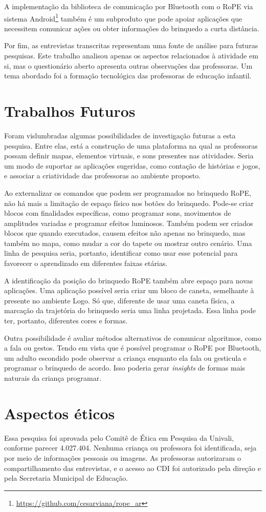 A implementação da biblioteca de comunicação por Bluetooth com o RoPE via sistema Android\footnote{\url{https://github.com/cesarviana/rope_ar}} também é um subproduto que pode apoiar aplicações que necessitem comunicar ações ou obter informações do brinquedo a curta distância. 

Por fim, as entrevistas transcritas representam uma fonte de análise para futuras pesquisas. Este trabalho analisou apenas os aspectos relacionados à atividade em si, mas o questionário aberto apresenta outras observações das professoras. Um tema abordado foi a formação tecnológica das professoras de educação infantil.

\section{Trabalhos Futuros}
\label{c_conclusao-trabalhos-futuros}
Foram vislumbradas algumas possibilidades de investigação futuras a esta pesquisa. Entre elas, está a construção de uma plataforma na qual as professoras possam definir mapas, elementos virtuais, e sons presentes nas atividades. Seria um modo de suportar as aplicações sugeridas, como contação de histórias e jogos, e associar a criatividade das professoras ao ambiente proposto.

Ao externalizar os comandos que podem ser programados no brinquedo RoPE, não há mais a limitação de espaço físico nos botões do brinquedo. Pode-se criar blocos com finalidades específicas, como programar sons, movimentos de amplitudes variadas e programar efeitos luminosos. Também podem ser criados blocos que quando executados, causem efeitos não apenas no brinquedo, mas também no mapa, como mudar a cor do tapete ou mostrar outro cenário. Uma linha de pesquisa seria, portanto, identificar como usar esse potencial para favorecer o aprendizado em diferentes faixas etárias.

A identificação da posição do brinquedo RoPE também abre espaço para novas aplicações. Uma aplicação possível seria criar um bloco de caneta, semelhante à presente no ambiente Logo. Só que, diferente de usar uma caneta física, a marcação da trajetória do brinquedo seria uma linha projetada. Essa linha pode ter, portanto, diferentes cores e formas.

Outra possibilidade é avaliar métodos alternativos de comunicar algoritmos, como a fala ou gestos. Tendo em vista que é possível programar o RoPE por Bluetooth, um adulto escondido pode observar a criança enquanto ela fala ou gesticula e programar o brinquedo de acordo. Isso poderia gerar \textit{insights} de formas mais naturais da criança programar.

\section{Aspectos éticos}
Essa pesquisa foi aprovada pelo Comitê de Ética em Pesquisa da Univali, conforme parecer 4.027.404. Nenhuma criança ou professora foi identificada, seja por meio de informações pessoais ou imagens. As professoras autorizaram o compartilhamento das entrevistas, e o acesso ao CDI foi autorizado pela direção e pela Secretaria Municipal de Educação.
